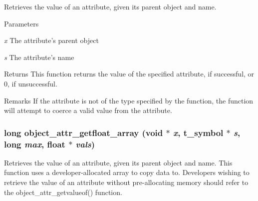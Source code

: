 Retrieves the value of an attribute, given its parent object and name. 
\begin{DoxyParams}{Parameters}
\item[{\em x}]The attribute's parent object \item[{\em s}]The attribute's name\end{DoxyParams}
\begin{DoxyReturn}{Returns}
This function returns the value of the specified attribute, if successful, or 0, if unsuccessful.
\end{DoxyReturn}
\begin{DoxyRemark}{Remarks}
If the attribute is not of the type specified by the function, the function will attempt to coerce a valid value from the attribute. 
\end{DoxyRemark}
\hypertarget{group__attr_ga14aeb57d5e8f65b6e7ee1966de521589}{
\subsubsection[{object\_\-attr\_\-getfloat\_\-array}]{\setlength{\rightskip}{0pt plus 5cm}long object\_\-attr\_\-getfloat\_\-array (void $\ast$ {\em x}, \/  {\bf t\_\-symbol} $\ast$ {\em s}, \/  long {\em max}, \/  float $\ast$ {\em vals})}}
\label{group__attr_ga14aeb57d5e8f65b6e7ee1966de521589}


Retrieves the value of an attribute, given its parent object and name. This function uses a developer-\/allocated array to copy data to. Developers wishing to retrieve the value of an attribute without pre-\/allocating memory should refer to the object\_\-attr\_\-getvalueof() function.


